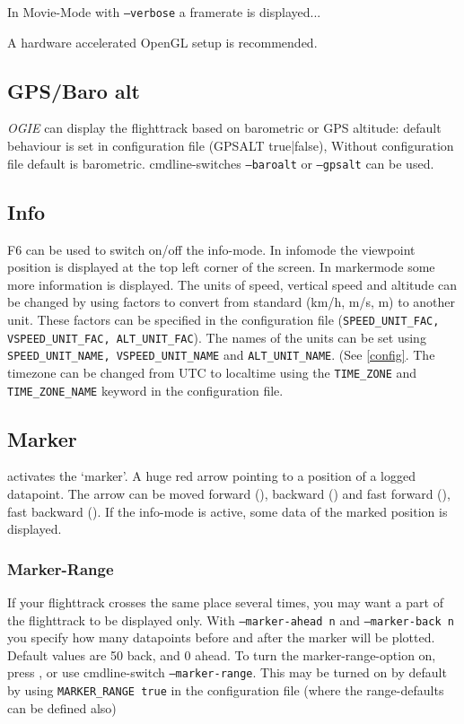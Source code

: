 In Movie-Mode  with \texttt{--verbose} a framerate is displayed...

A hardware accelerated OpenGL setup is recommended.


\subsection{GPS/Baro alt}

\emph{OGIE} can display the flighttrack based on barometric or GPS altitude:
default behaviour is set in configuration file (GPSALT true|false),
Without configuration file default is barometric.
cmdline-switches \texttt{--baroalt} or \texttt{--gpsalt} can be used.


\subsection{Info}
\label{info}
F6 can be used to switch on/off the info-mode. In infomode the viewpoint position is displayed
at the top left corner of the screen.
In markermode some more information is displayed. The units of speed, vertical speed and altitude can be changed by using factors to convert from standard (km/h, m/s, m) to another unit. These factors can be specified in the configuration file (\texttt{SPEED\_UNIT\_FAC, VSPEED\_UNIT\_FAC, ALT\_UNIT\_FAC}). The names of the units can be set using \texttt{SPEED\_UNIT\_NAME, VSPEED\_UNIT\_NAME} and \texttt{ALT\_UNIT\_NAME}. (See \ref{config}. The timezone can be changed from UTC to localtime using the \texttt{TIME\_ZONE} and \texttt{TIME\_ZONE\_NAME} keyword in the configuration file.


\subsection{Marker}
\label{marker}
 activates the `marker'. A huge red arrow pointing to a position of a logged datapoint.
The arrow can be moved forward (), backward () and fast forward (),
fast backward (). If the info-mode is active, some data of the marked
position is displayed.


\subsubsection{Marker-Range}

If your flighttrack crosses the same place several times, you may want a part of
the flighttrack to be displayed only. With \texttt{--marker-ahead n}  and \texttt{--marker-back n}
you specify how many datapoints before and after the marker will be plotted. Default values are
50 back, and 0 ahead. To turn the marker-range-option on, press , or use
cmdline-switch \texttt{--marker-range}. This may be turned on by default by using
\texttt{MARKER\_RANGE true} in the configuration file (where the range-defaults can be defined
also)

